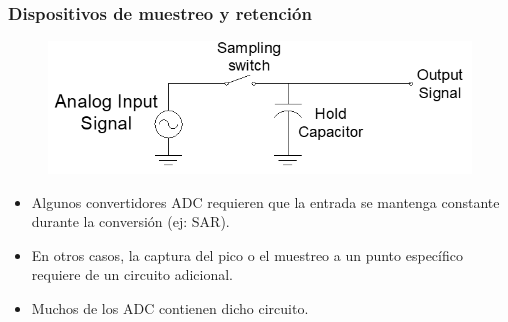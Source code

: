 \documentclass[10.5pt,scale=1.0,t,aspectratio=169,hyperref={pdfpagelabels=false}]{beamer}
\begin{document}
\begin{frame}
	\frametitle{Dispositivos de muestreo y retención}
	{\small
		\begin{figure}
			\centering\includegraphics[scale=0.5]{fig_SampleHold}
		\end{figure}
		
		\begin{itemize}
			\item Algunos convertidores ADC requieren que la entrada se mantenga constante durante la conversión (ej: SAR).
			\item En otros casos, la captura del pico o el muestreo a un punto específico requiere de un circuito adicional.
			\item Muchos de los ADC contienen dicho circuito. 
		\end{itemize}
	}	
\end{frame}
\end{document}
